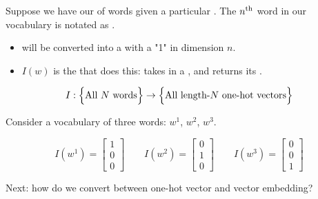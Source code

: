         \begin{notation}
            Suppose we have our  of words given a particular . The $n^{ \text{th} }$ word in our vocabulary is notated as .

            \begin{itemize}
                \item {} will be converted into a  with a "1" in dimension $n$.

                \item $I(w)$ is the  that does this: takes in a , and returns its .
            \end{itemize}

            \begin{equation*}
                I: \Bigl\{\text{All $N$ words}\Bigr\} \to \Bigl\{\text{All length-$N$ one-hot vectors}\Bigr\}
            \end{equation*}
            
        \end{notation}

        \miniex Consider a vocabulary of three words: $w^1$, $w^2$, $w^3$.

        \begin{equation*}
            I(w^1) = \begin{bmatrix}
                1 \\ 0 \\ 0
            \end{bmatrix}
            \qquad
            I(w^2) = \begin{bmatrix}
                0 \\ 1 \\ 0
            \end{bmatrix}
            \qquad
            I(w^3) = \begin{bmatrix}
                0 \\ 0 \\ 1
            \end{bmatrix}
        \end{equation*}

    Next: how do we convert between one-hot vector and vector embedding?\\

